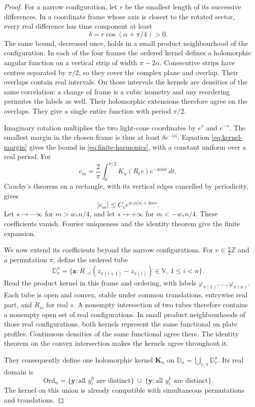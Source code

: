\documentclass[11pt,letterpaper,reqno]{amsart}
\theoremstyle{definition}
\theoremstyle{remark}
\begin{document}
\begin{proof}
For a narrow configuration, let $r$ be the smallest length of its
successive differences. In a coordinate frame whose axis is closest
to the rotated sector, every real difference has time component at
least
\[
 \delta=r\cos(\alpha+\pi/4)>0.
\]
The same bound, decreased once, holds in a small product neighbourhood
of the configuration. In each of the four frames the ordered kernel
defines a holomorphic angular function on a vertical strip of width
$\pi-2\alpha$. Consecutive strips have centres separated by $\pi/2$,
so they cover the complex plane and overlap. Their overlaps contain
real intervals. On those intervals the kernels are densities of the
same correlation: a change of frame is a cubic isometry and any
reordering permutes the labels as well. Their holomorphic extensions
therefore agree on the overlaps. They give a single entire function
with period $\pi/2$.

Imaginary rotation multiplies the two light-cone coordinates by
$e^s$ and $e^{-s}$. The smallest margin in the chosen frame is thus
at least $\delta e^{-|s|}$. Equation \eqref{eq:kernel-margin} gives
the bound in \eqref{eq:finite-harmonics}, with a constant uniform
over a real period. For
\[
 c_m=\frac2\pi\int_0^{\pi/2}K_n(R_tv)e^{-4imt}\,dt,
\]
Cauchy's theorem on a rectangle, with its vertical edges cancelled
by periodicity, gives
\[
 |c_m|\le C_v e^{w_*n|s|+4ms}.
\]
Let $s\to-\infty$ for $m>w_*n/4$, and let $s\to+\infty$ for
$m<-w_*n/4$. These coefficients vanish. Fourier uniqueness and the
identity theorem give the finite expansion.

We now extend its coefficients beyond the narrow configurations.
For $\upsilon\in\frac\pi2\mathbb Z$ and a permutation $\pi$, define
the ordered tube
\[
 \mathbb D^\pi_\upsilon=
 \{\mathbf z:
    R_{-\upsilon}(z_{\pi(i+1)}-z_{\pi(i)})\in\mathbb V,
                                             \ 1\le i<n\}.
\]
Read the product kernel in this frame and ordering, with labels
$\varphi_{\pi(1)},\ldots,\varphi_{\pi(n)}$. Each tube is open and
convex, stable under common translations, entrywise real part, and
$R_{is}$ for real $s$. A nonempty intersection of two tubes therefore
contains a nonempty open set of real configurations. In small product
neighbourhoods of those real configurations, both kernels represent
the same functional on plate profiles. Continuous densities of the
same functional agree there. The identity theorem on the convex
intersection makes the kernels agree throughout it.

They consequently define one holomorphic kernel $\mathbf K_n$ on
$\mathbb D_n=\bigcup_{\upsilon,\pi}\mathbb D^\pi_\upsilon$. Its
real domain is
\[
 \mathrm{Ord}_n=
 \{\mathbf y:\text{all }y_i^0\text{ are distinct}\}
 \ \cup\
 \{\mathbf y:\text{all }y_i^1\text{ are distinct}\}.
\]
The kernel on this union is already compatible with simultaneous
permutations and translations.


\end{proof}
\end{document}
